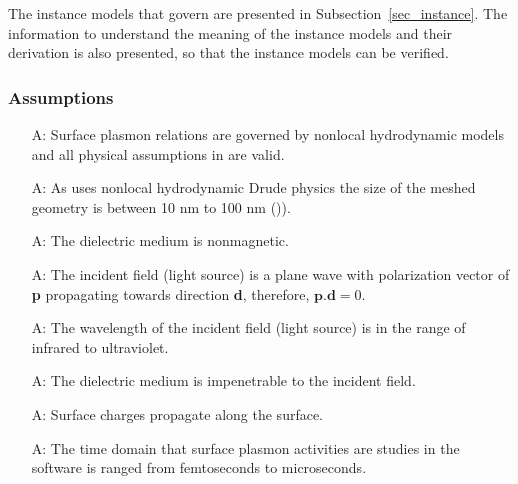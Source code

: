 \documentclass[12pt]{article}
\newcounter{assumpnum} %
\begin{document}
	The instance models that govern \progname{} are presented in
	Subsection~\ref{sec_instance}.  The information to understand the meaning of the
	instance models and their derivation is also presented, so that the instance
	models can be verified.
	
	\subsubsection{Assumptions} \label{sec_assumpt}
	
	
	\begin{itemize}
		
		\item[A\refstepcounter{assumpnum}\theassumpnum \label{A_nonlocal}:] Surface
		plasmon relations are governed by nonlocal hydrodynamic models and all physical
		assumptions in \cite{hiremath2012numerical} are valid.
		
		\item[A\refstepcounter{assumpnum}\theassumpnum \label{A_size}:] As \progname{}
		uses nonlocal hydrodynamic Drude physics the size of the meshed geometry is
		between 10 nm to 100 nm (\cite{hiremath2012numerical})).
		
		\item[A\refstepcounter{assumpnum}\theassumpnum \label{A_nonmag}:] The dielectric
		medium is nonmagnetic.
		
		\item[A\refstepcounter{assumpnum}\theassumpnum \label{A_pd}:] The incident field
		(light source) is a plane wave with polarization vector of \textbf{p}
		propagating towards direction \textbf{d}, therefore, $\textbf{p}.\textbf{d} =
		0$.
		
		\item[A\refstepcounter{assumpnum}\theassumpnum \label{A_wl}:] The wavelength of
		the incident field (light source) is in the range of infrared to ultraviolet.
		
		\item[A\refstepcounter{assumpnum}\theassumpnum \label{A_impenetrable}:] The
		dielectric medium is impenetrable to the incident field.
		
		\item[A\refstepcounter{assumpnum}\theassumpnum \label{A_leakage}:] Surface
		charges propagate along the surface.
		
		\item[A\refstepcounter{assumpnum}\theassumpnum \label{A_time}:] The time
		domain that surface plasmon activities are studies in the software is ranged
		from femtoseconds to microseconds.
		
		
	\end{itemize}
	
\end{document}
